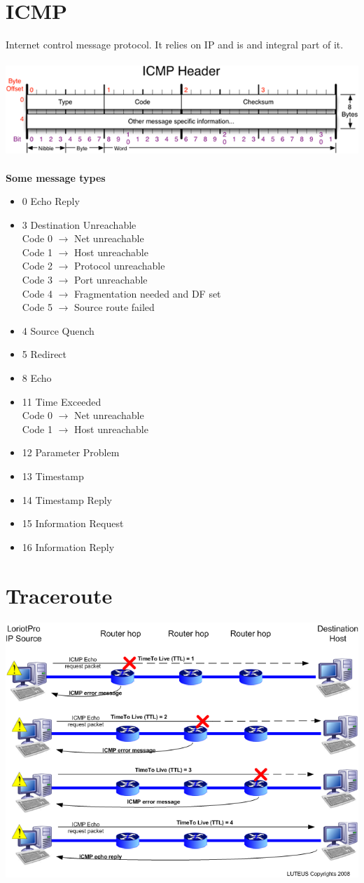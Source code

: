 \documentclass[10pt,a4paper]{book}
\begin{document}
\section{ICMP} Internet control message protocol. It relies on IP and is and integral part of it.\\\\
\includegraphics[scale=0.9]{icmp.png}\\\\
\textbf{Some message types}
\begin{itemize}
\item 0  Echo Reply
\item 3  Destination Unreachable\\
Code 0 $\to$ Net unreachable\\
Code 1 $\to$ Host unreachable\\
Code 2 $\to$ Protocol unreachable\\
Code 3 $\to$ Port unreachable\\
Code 4 $\to$ Fragmentation needed and DF set\\
Code 5 $\to$ Source route failed
\item 4  Source Quench
\item 5  Redirect
\item 8  Echo
\item 11  Time Exceeded\\
Code 0 $\to$ Net unreachable\\
Code 1 $\to$ Host unreachable
\item 12  Parameter Problem
\item 13  Timestamp
\item 14  Timestamp Reply
\item 15  Information Request
\item 16  Information Reply
\end{itemize}
\section{Traceroute}
\includegraphics[scale=0.5]{traceroute.png}
\newpage
\end{document}
